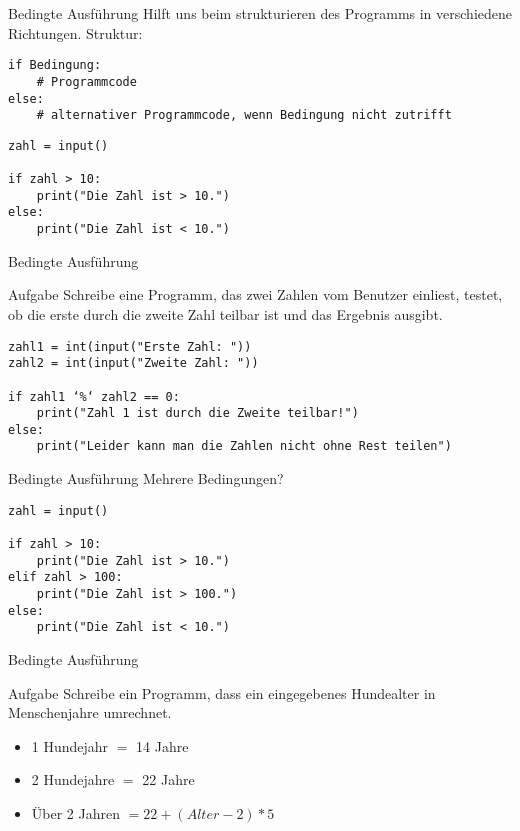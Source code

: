 \begin{frame}[fragile]{Bedingte Ausführung}
Hilft uns beim strukturieren des Programms in verschiedene Richtungen.
Struktur:

\begin{lstlisting}
if Bedingung:
    # Programmcode
else:
    # alternativer Programmcode, wenn Bedingung nicht zutrifft
\end{lstlisting}
\pause{}
\begin{lstlisting}
zahl = input()

if zahl > 10:
    print("Die Zahl ist > 10.")
else:
    print("Die Zahl ist < 10.")
\end{lstlisting}
\end{frame}

\begin{frame}[fragile]{Bedingte Ausführung}
    \begin{block}{Aufgabe}
        Schreibe eine Programm, das zwei Zahlen vom Benutzer einliest, testet, 
        ob die erste durch die zweite Zahl teilbar ist und das Ergebnis ausgibt.
        \pause{}
        \begin{lstlisting}
zahl1 = int(input("Erste Zahl: "))
zahl2 = int(input("Zweite Zahl: "))

if zahl1 ‘%‘ zahl2 == 0:
    print("Zahl 1 ist durch die Zweite teilbar!")
else: 
    print("Leider kann man die Zahlen nicht ohne Rest teilen")
        \end{lstlisting}
    \end{block}
\end{frame}

\begin{frame}[fragile]{Bedingte Ausführung}
Mehrere Bedingungen?
\pause{}
\begin{lstlisting}
zahl = input()

if zahl > 10:
    print("Die Zahl ist > 10.")
elif zahl > 100:
    print("Die Zahl ist > 100.")
else:
    print("Die Zahl ist < 10.")

\end{lstlisting}
\end{frame}

\begin{frame}{Bedingte Ausführung}
    \begin{block}{Aufgabe}
        Schreibe ein Programm, dass ein eingegebenes Hundealter in Menschenjahre umrechnet.
        \begin{itemize}
            \item 1 Hundejahr $=$ 14 Jahre
            \item 2 Hundejahre $=$ 22 Jahre
            \item Über 2 Jahren $= 22 + (Alter -2) * 5$
        \end{itemize}
    \end{block}
\end{frame}

